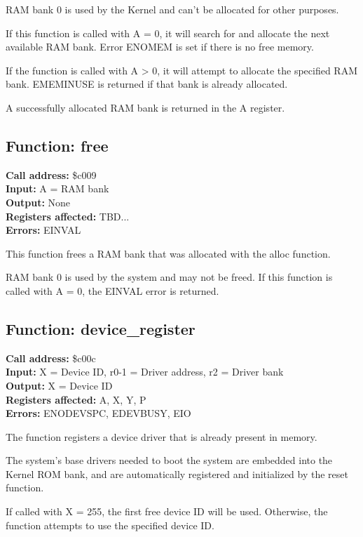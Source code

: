 RAM bank 0 is used by the Kernel and can't be allocated for other purposes.

If this function is called with A = 0, it will search for and allocate the next available
RAM bank. Error ENOMEM is set if there is no free memory.

If the function is called with A > 0, it will attempt to allocate the specified RAM bank.
EMEMINUSE is returned if that bank is already allocated.

A successfully allocated RAM bank is returned in the A register.


\subsection{Function: free}

\textbf{Call address:} \$c009 \\
\textbf{Input:} A = RAM bank \\
\textbf{Output:} None \\
\textbf{Registers affected:} TBD... \\
\textbf{Errors:} EINVAL

This function frees a RAM bank that was allocated with the alloc function.

RAM bank 0 is used by the system and may not be freed. If this function is
called with A = 0, the EINVAL error is returned.


\subsection{Function: device\_register}

\textbf{Call address:} \$c00c \\
\textbf{Input:} X = Device ID, r0-1 = Driver address, r2 = Driver bank \\
\textbf{Output:} X = Device ID \\
\textbf{Registers affected:} A, X, Y, P \\
\textbf{Errors:} ENODEVSPC, EDEVBUSY, EIO

The function registers a device driver that is already present in memory.

The system's base drivers needed to boot the system are embedded into
the Kernel ROM bank, and are automatically registered and initialized by
the reset function.

If called with X = 255, the first free device ID will be used. Otherwise, the function 
attempts to use the specified device ID.


